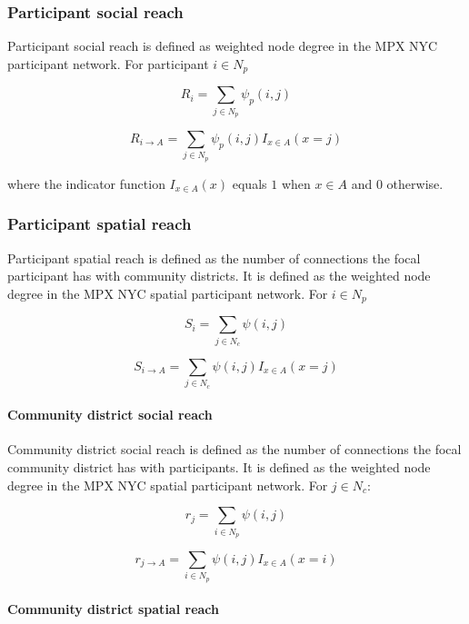 \documentclass[
  letterpaper,
  DIV=11,
  numbers=noendperiod,
  oneside]{scrreprt}
\let\oldparagraph\paragraph
\renewcommand{\paragraph}[1]{\oldparagraph{#1}\mbox{}}
\begin{document}
\hypertarget{participant-social-reach}{%
\subsubsection{Participant social
reach}\label{participant-social-reach}}

Participant social reach is defined as weighted node degree in the MPX
NYC participant network. For participant \(i \in N_p\)

\[
R_i = \sum_{j \in N_p}{\psi_p (i,j)}
\]

\[
R_{i  \rightarrow A} = \sum_{j \in N_p}{\psi_p (i,j)I_{x \in A}(x = j) }
\]

where the indicator function \(I_{x \in A}(x)\) equals \(1\) when
\(x\in A\) and \(0\) otherwise.

\hypertarget{participant-spatial-reach}{%
\subsubsection{Participant spatial
reach}\label{participant-spatial-reach}}

Participant spatial reach is defined as the number of connections the
focal participant has with community districts. It is defined as the
weighted node degree in the MPX NYC spatial participant network. For
\(i \in N_p\)

\[
S_i = \sum_{j \in N_c}{\psi (i,j)}
\]

\[
S_{i \rightarrow A} = \sum_{j \in N_c}{\psi (i,j)I_{x \in A}(x = j)}
\]

\hypertarget{community-district-social-reach}{%
\paragraph{Community district social
reach}\label{community-district-social-reach}}

Community district social reach is defined as the number of connections
the focal community district has with participants. It is defined as the
weighted node degree in the MPX NYC spatial participant network. For
\(j \in N_c\):

\[
r_j = \sum_{i \in N_p}{\psi (i, j)}
\]

\[
r_{j  \rightarrow A} = \sum_{i \in N_p}{\psi (i, j)I_{x \in A}(x = i)}
\]

\hypertarget{community-district-spatial-reach}{%
\paragraph{Community district spatial
reach}\label{community-district-spatial-reach}}
\end{document}
